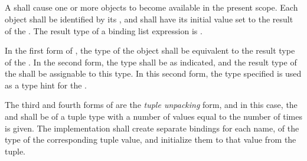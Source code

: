 \begin{grammar}
 \\
	   \\
	   \\

 \\
	 \optional{\terminal{,}} \\
	 \terminal{,}  \\

 \\
	 \terminal{=}  \\
	 \terminal{:}  \terminal{=}  \\
	\terminal{(}  \terminal{)}  \terminal{=}  \\
	\terminal{(}  \terminal{)} \terminal{:}  \terminal{=}  \\

 \\
	 \terminal{,}  \\
	 \terminal{,}  \\
\end{grammar}

\specsubsubitem
A  shall cause one or more objects to become
available in the present scope. Each object shall be identified by its
, and shall have its initial value set to the result of the
. The result
type of a binding list expression is .

\specsubsubitem
In the first form of , the type of the object shall
be equivalent to the result type of the . In the
second form, the type shall be as indicated, and the result type of the
 shall be assignable to this type. In this second form,
the type specified is used as a type hint for the .

\specsubsubitem
The third and fourth forms of  are the \textit{tuple
unpacking} form, and in this case, the  and
 shall be of a tuple type with a number of values equal
to the number of times  is given. The implementation shall
create separate bindings for each name, of the type of the corresponding tuple
value, and initialize them to that value from the tuple.

